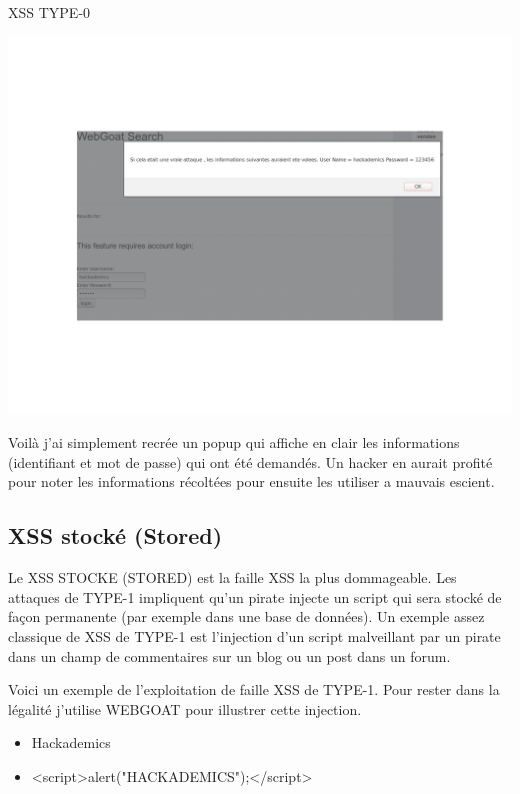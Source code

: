 \begin{itemize}
\begin{center}
\caption{XSS TYPE-0}
\includegraphics[scale=0.3]{Web/assets/xss1.png}
\end{center}

\begin{flushleft}
Voilà j'ai simplement recrée un popup qui affiche en clair les informations (identifiant et mot de passe) qui ont été demandés. Un hacker en aurait profité pour noter les informations récoltées pour ensuite les utiliser a mauvais escient.
\end{flushleft}

\subsection{XSS stocké (Stored)}\label{vulnerabilites:web:xss:stored}

Le XSS STOCKE (STORED) est la faille XSS la plus dommageable. Les attaques de TYPE-1 impliquent qu'un pirate injecte un script qui sera stocké de façon permanente (par exemple dans une base de données). Un exemple assez classique de XSS de TYPE-1 est l'injection d'un script malveillant par un pirate dans un champ de commentaires sur un blog ou un post dans un forum.

\begin{flushleft}
Voici un exemple de l'exploitation de faille XSS de TYPE-1. Pour rester dans la légalité j'utilise WEBGOAT pour illustrer cette injection.
\end{flushleft}

\bigskip

\begin{itemize}
\item Hackademics
\item <script>alert("HACKADEMICS");</script>
\end{itemize}



\end{itemize}
